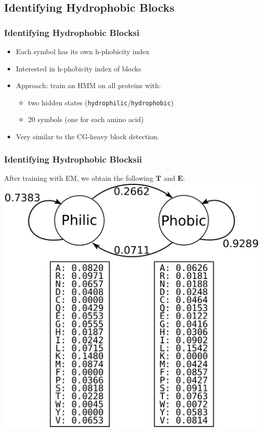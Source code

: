 \documentclass[11pt]{beamer}
\newcommand{\vect}[1]{\boldsymbol{\mathbf{#1}}}
\begin{document}
    \subsection{Identifying Hydrophobic Blocks}
    \begin{frame}
        \frametitle{Identifying Hydrophobic Blocks\quad i}
        \begin{itemize}
            \item Each symbol has its own h-phobicity index
            \item Interested in h-phobicity index of blocks
            \item Approach: train an HMM on all proteins with:
            \begin{itemize}
                \item two hidden states (\texttt{hydrophilic}/\texttt{hydrophobic})
                \item 20 symbols (one for each amino acid)
            \end{itemize}
            \item Very similar to the CG-heavy block detection.
        \end{itemize}
        
    \end{frame}

    \begin{frame}
        \frametitle{Identifying Hydrophobic Blocks\quad ii}
        After training with EM, we obtain the following $\vect{T}$ and $\vect{E}$:
        \centering
        \includegraphics[height=0.8\textheight]{images/or_hydro_params.png}
    \end{frame}
\end{document}

